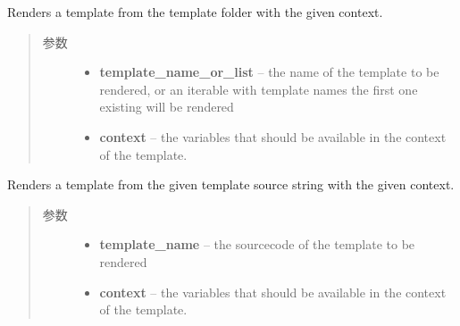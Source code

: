 \documentclass[a4paper,12pt]{sphinxmanual}
\begin{document}
\begin{fulllineitems}
\label{api:flask.render_template}
Renders a template from the template folder with the given
context.
\begin{quote}\begin{description}
\item[{参数}] \leavevmode\begin{itemize}
\item {} 
\textbf{template\_name\_or\_list} -- the name of the template to be
rendered, or an iterable with template names
the first one existing will be rendered

\item {} 
\textbf{context} -- the variables that should be available in the
context of the template.

\end{itemize}

\end{description}\end{quote}

\end{fulllineitems}


\begin{fulllineitems}
\label{api:flask.render_template_string}
Renders a template from the given template source string
with the given context.
\begin{quote}\begin{description}
\item[{参数}] \leavevmode\begin{itemize}
\item {} 
\textbf{template\_name} -- the sourcecode of the template to be
rendered

\item {} 
\textbf{context} -- the variables that should be available in the
context of the template.

\end{itemize}

\end{description}\end{quote}

\end{fulllineitems}
\end{document}
